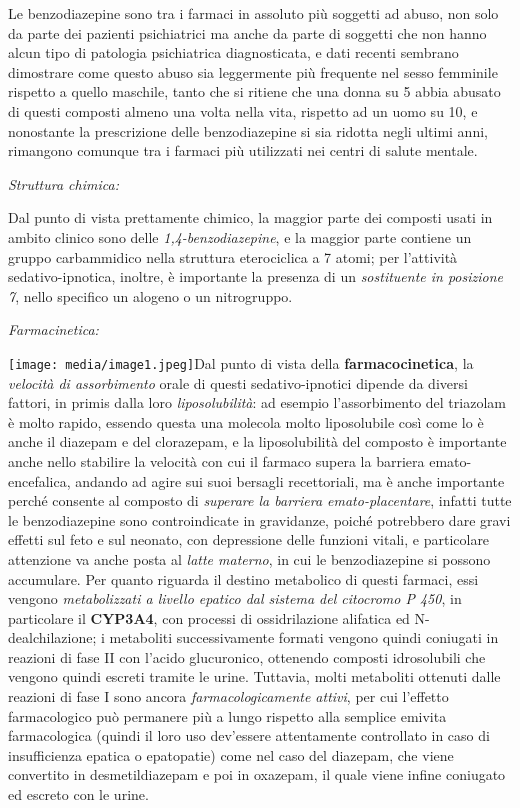 \documentclass[]{article}
\begin{document}
Le benzodiazepine sono tra i farmaci in assoluto più soggetti ad abuso,
non solo da parte dei pazienti psichiatrici ma anche da parte di
soggetti che non hanno alcun tipo di patologia psichiatrica
diagnosticata, e dati recenti sembrano dimostrare come questo abuso sia
leggermente più frequente nel sesso femminile rispetto a quello
maschile, tanto che si ritiene che una donna su 5 abbia abusato di
questi composti almeno una volta nella vita, rispetto ad un uomo su 10,
e nonostante la prescrizione delle benzodiazepine si sia ridotta negli
ultimi anni, rimangono comunque tra i farmaci più utilizzati nei centri
di salute mentale.

\emph{\emph{Struttura chimica:}}

Dal punto di vista prettamente chimico, la maggior parte dei composti
usati in ambito clinico sono delle \emph{1,4-benzodiazepine}, e la
maggior parte contiene un gruppo carbammidico nella struttura
eterociclica a 7 atomi; per l'attività sedativo-ipnotica, inoltre, è
importante la presenza di un \emph{sostituente in posizione 7}, nello
specifico un alogeno o un nitrogruppo.

\emph{\emph{Farmacinetica:}}

\texttt{[image: media/image1.jpeg]}Dal
punto di vista della \textbf{farmacocinetica}, la \emph{velocità di
assorbimento} orale di questi sedativo-ipnotici dipende da diversi
fattori, in primis dalla loro \emph{liposolubilità}: ad esempio
l'assorbimento del triazolam è molto rapido, essendo questa una molecola
molto liposolubile così come lo è anche il diazepam e del clorazepam, e
la liposolubilità del composto è importante anche nello stabilire la
velocità con cui il farmaco supera la barriera emato-encefalica, andando
ad agire sui suoi bersagli recettoriali, ma è anche importante perché
consente al composto di \emph{superare la barriera emato-placentare},
infatti tutte le benzodiazepine sono controindicate in gravidanze,
poiché potrebbero dare gravi effetti sul feto e sul neonato, con
depressione delle funzioni vitali, e particolare attenzione va anche
posta al \emph{latte materno}, in cui le benzodiazepine si possono
accumulare. Per quanto riguarda il destino metabolico di questi farmaci,
essi vengono \emph{metabolizzati a livello epatico dal sistema del
citocromo P 450}, in particolare il \textbf{CYP3A4}, con processi di
ossidrilazione alifatica ed N-dealchilazione; i metaboliti
successivamente formati vengono quindi coniugati in reazioni di fase II
con l'acido glucuronico, ottenendo composti idrosolubili che vengono
quindi escreti tramite le urine. Tuttavia, molti metaboliti ottenuti
dalle reazioni di fase I sono ancora \emph{farmacologicamente attivi},
per cui l'effetto farmacologico può permanere più a lungo rispetto alla
semplice emivita farmacologica (quindi il loro uso dev'essere
attentamente controllato in caso di insufficienza epatica o epatopatie)
come nel caso del diazepam, che viene convertito in desmetildiazepam e
poi in oxazepam, il quale viene infine coniugato ed escreto con le
urine.
\end{document}
